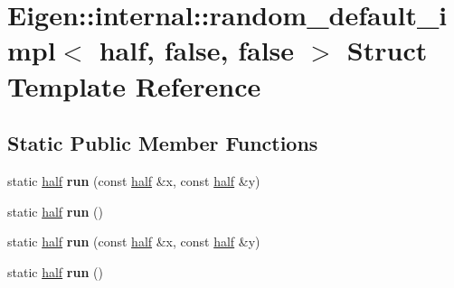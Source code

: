\hypertarget{struct_eigen_1_1internal_1_1random__default__impl_3_01half_00_01false_00_01false_01_4}{}\section{Eigen\+:\+:internal\+:\+:random\+\_\+default\+\_\+impl$<$ half, false, false $>$ Struct Template Reference}
\label{struct_eigen_1_1internal_1_1random__default__impl_3_01half_00_01false_00_01false_01_4}
\subsection*{Static Public Member Functions}
\begin{DoxyCompactItemize}
\item 
\mbox{\label{struct_eigen_1_1internal_1_1random__default__impl_3_01half_00_01false_00_01false_01_4_aa4b9b3a615a7f3ea51a5464d407f81bd}} 
static \hyperlink{struct_eigen_1_1half}{half} {\bfseries run} (const \hyperlink{struct_eigen_1_1half}{half} \&x, const \hyperlink{struct_eigen_1_1half}{half} \&y)
\item 
\mbox{\label{struct_eigen_1_1internal_1_1random__default__impl_3_01half_00_01false_00_01false_01_4_aa412e9550f2904677f72b074ddde7cf8}} 
static \hyperlink{struct_eigen_1_1half}{half} {\bfseries run} ()
\item 
\mbox{\label{struct_eigen_1_1internal_1_1random__default__impl_3_01half_00_01false_00_01false_01_4_aa4b9b3a615a7f3ea51a5464d407f81bd}} 
static \hyperlink{struct_eigen_1_1half}{half} {\bfseries run} (const \hyperlink{struct_eigen_1_1half}{half} \&x, const \hyperlink{struct_eigen_1_1half}{half} \&y)
\item 
\mbox{\label{struct_eigen_1_1internal_1_1random__default__impl_3_01half_00_01false_00_01false_01_4_aa412e9550f2904677f72b074ddde7cf8}} 
static \hyperlink{struct_eigen_1_1half}{half} {\bfseries run} ()
\end{DoxyCompactItemize}


